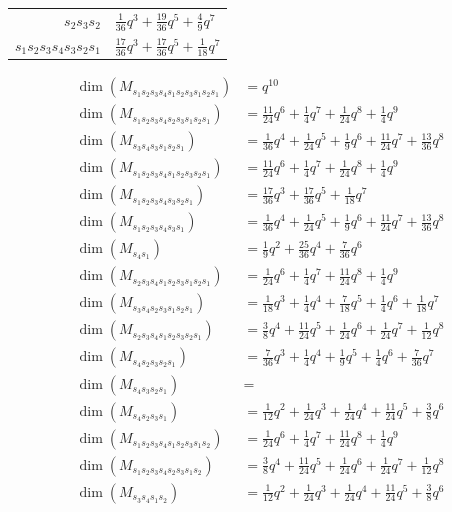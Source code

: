 \documentclass{amsart}
\theoremstyle{definition}
\begin{document}
\begin{table}[p]
{\begin{tabular}{|r|l|}
    $s_2s_3s_2$ & $\frac{1}{36}q^3 + \frac{19}{36}q^5 + \frac{4}{9}q^7$ \\
    $s_1s_2s_3s_4s_3s_2s_1$ & $\frac{17}{36}q^3 + \frac{17}{36}q^5 + \frac{1}{18}q^7$ \\
    \hline
\end{tabular}}
\iffalse
{\small\begin{align*}
        \dim(M_{s_1s_2s_3s_4s_1s_2s_3s_1s_2s_1}) & = q^{10} \\
\dim(M_{s_1s_2s_3s_4s_2s_3s_1s_2s_1}) & = \frac{11}{24}q^6 + \frac{1}{4}q^7 + \frac{1}{24}q^8 + \frac{1}{4}q^9 \\
\dim(M_{s_3s_4s_3s_1s_2s_1}) & = \frac{1}{36}q^4 + \frac{1}{24}q^5 + \frac{1}{9}q^6 + \frac{11}{24}q^7 + \frac{13}{36}q^8 \\
\dim(M_{s_1s_2s_3s_4s_1s_2s_3s_2s_1}) & = \frac{11}{24}q^6 + \frac{1}{4}q^7 + \frac{1}{24}q^8 + \frac{1}{4}q^9 \\
\dim(M_{s_1s_2s_3s_4s_3s_2s_1}) & = \frac{17}{36}q^3 + \frac{17}{36}q^5 + \frac{1}{18}q^7 \\
\dim(M_{s_1s_2s_3s_4s_3s_1}) & = \frac{1}{36}q^4 + \frac{1}{24}q^5 + \frac{1}{9}q^6 + \frac{11}{24}q^7 + \frac{13}{36}q^8 \\
\dim(M_{s_4s_1}) & = \frac{1}{9}q^2 + \frac{25}{36}q^4 + \frac{7}{36}q^6 \\
\dim(M_{s_2s_3s_4s_1s_2s_3s_1s_2s_1}) & = \frac{1}{24}q^6 + \frac{1}{4}q^7 + \frac{11}{24}q^8 + \frac{1}{4}q^9 \\
\dim(M_{s_3s_4s_2s_3s_1s_2s_1}) & = \frac{1}{18}q^3 + \frac{1}{4}q^4 + \frac{7}{18}q^5 + \frac{1}{4}q^6 + \frac{1}{18}q^7 \\
\dim(M_{s_2s_3s_4s_1s_2s_3s_2s_1}) & = \frac{3}{8}q^4 + \frac{11}{24}q^5 + \frac{1}{24}q^6 + \frac{1}{24}q^7 + \frac{1}{12}q^8 \\
\dim(M_{s_4s_2s_3s_2s_1}) & = \frac{7}{36}q^3 + \frac{1}{4}q^4 + \frac{1}{9}q^5 + \frac{1}{4}q^6 + \frac{7}{36}q^7 \\
\dim(M_{s_4s_3s_2s_1}) & =  \\
\dim(M_{s_4s_2s_3s_1}) & = \frac{1}{12}q^2 + \frac{1}{24}q^3 + \frac{1}{24}q^4 + \frac{11}{24}q^5 + \frac{3}{8}q^6 \\
\dim(M_{s_1s_2s_3s_4s_1s_2s_3s_1s_2}) & = \frac{1}{24}q^6 + \frac{1}{4}q^7 + \frac{11}{24}q^8 + \frac{1}{4}q^9 \\
\dim(M_{s_1s_2s_3s_4s_2s_3s_1s_2}) & = \frac{3}{8}q^4 + \frac{11}{24}q^5 + \frac{1}{24}q^6 + \frac{1}{24}q^7 + \frac{1}{12}q^8 \\
\dim(M_{s_3s_4s_1s_2}) & = \frac{1}{12}q^2 + \frac{1}{24}q^3 + \frac{1}{24}q^4 + \frac{11}{24}q^5 + \frac{3}{8}q^6 \\

\end{align*}}
\end{table}
\end{document}
